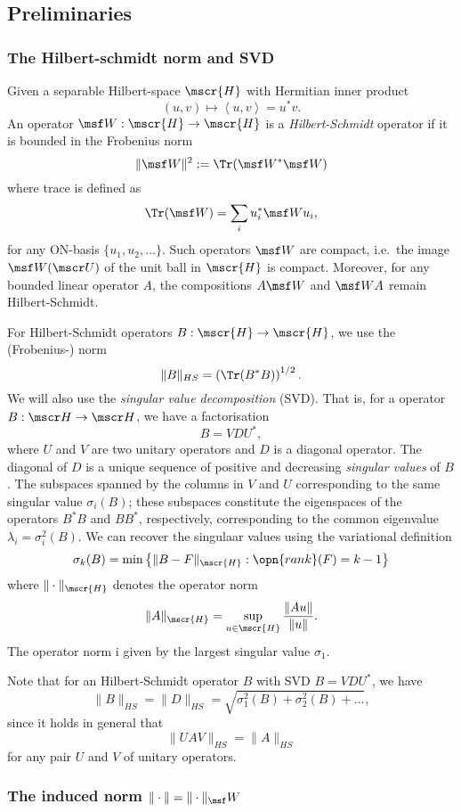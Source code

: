 \documentclass[11pt]{scrartcl}
\renewcommand{\T}{^*}
\renewcommand{\H}{\mscr{H}}
\theoremstyle{plain} %
\theoremstyle{definition}
\begin{document}
\def\scp#1#2{\left\langle #1, #2\right\rangle}
\def\W{\msf W}

\subsection{Preliminaries}

\subsubsection{The Hilbert-schmidt norm and SVD}

Given a separable Hilbert-space $\H$ with Hermitian inner product 
$$(u,v) \mapsto \scp uv = u^*v. $$
An operator $\W:\H\to\H$ is a \emph{Hilbert-Schmidt} operator if it is bounded in
the Frobenius norm
$$ \| \W \|^2 := \Tr(\W\T \W) $$
where trace is defined as 
$$ \Tr( \W ) = \sum_{i} u_i\T \W u_i, $$ 
for any ON-basis $\{u_1,u_2,\dots\}$. 
Such operators $\W$ are compact, i.e.\ the image $\W(\mscr U)$ of the
unit ball in $\H$ is compact. Moreover, for any bounded linear
operator $A$, the compositions $A\W$ and $\W A$ remain
Hilbert-Schmidt. 

For Hilbert-Schmidt operators $B:\H\to\H$, we use the (Frobenius-) norm 
$$ \| B \|_{HS} = \left( \Tr(B\T B) \right)^{1/2}. $$
We will also use the \emph{singular value decomposition} (SVD). That is, for a
operator $B:\mscr H\to\mscr H$, we have a factorisation
$$ B = V D U^*, $$ 
where $U$ and $V$ are two unitary operators and $D$ is a diagonal
operator. The diagonal of $D$ is a unique sequence of positive and
decreasing \emph{singular values} of $B$.  The subspaces spanned by
the columns in $V$ and $U$ corresponding to the same singular value
$\sigma_i(B)$; these subspaces constitute the eigenspaces of the
operators $B^*B$ and $BB^*$, respectively, corresponding to the common
eigenvalue $\lambda_i=\sigma_i^2(B)$. We can recover the singulaar
values using the variational definition
$$ \sigma_k(B) = \min\left\{\|B-F\|_{\H} : \opn{rank}(F)=k-1 \right\} $$
where $\| \cdot \|_{\H}$ denotes the operator norm 
$$ \| A \|_{\H} = \sup_{u\in\H} \frac{\| A u \|}{\| u \|}. $$
The operator norm i given by the largest singular value $\sigma_1$.

Note that for an Hilbert-Schmidt operator $B$ with SVD $B=V D U^*$, we
have
$$ \| B \|_{HS} = \| D \|_{HS} = \sqrt{\sigma_1^2(B)+\sigma_2^2(B)+\dots}, $$
since it holds in general that $$\| U A V \|_{HS} = \|A\|_{HS}$$ for
any pair $U$ and $V$ of unitary operators.

\subsubsection{The induced norm $\|\cdot\| =\|\cdot\|_\W$}
\end{document}
